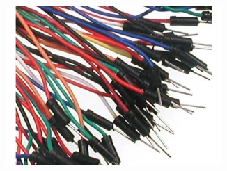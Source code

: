\begin{frame}
\begin{columns}
    \includegraphics[height=0.15\textheight]{common/jumper-wires.jpg}
    \vspace{1cm}
  \end{columns}
\end{frame}

